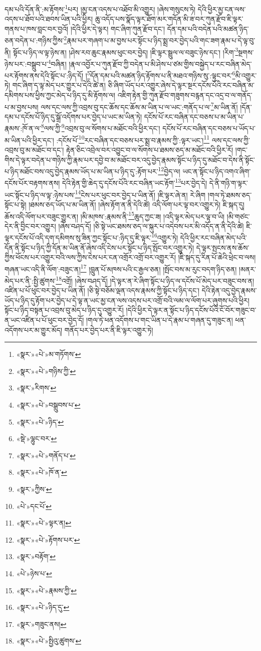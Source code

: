 དམ་པའི་དོན་ནི་:མ་རྟོགས་\footnote{«སྣར་»«པེ་»མ་གཏོགས་}པར། །མྱ་ངན་འདས་པ་འཐོབ་མི་འགྱུར། །ཞེས་གསུངས་ཏེ། དེའི་ཕྱིར་མྱ་ངན་ལས་འདས་པ་ཐོབ་པའི་ཐབས་ཡིན་པའི་ཕྱིར། ཆུ་འདོད་པས་སྣོད་ལྟར་ཐོག་མར་གདོན་མི་ཟ་བར་ཀུན་རྫོབ་ཇི་ལྟར་གནས་པ་ཁས་བླང་བར་བྱའོ། །དེའི་ཕྱིར་དེ་ལྟར། གང་ཞིག་ཀུན་རྫོབ་དང་། དོན་དམ་པའི་བདེན་པའི་མཚན་ཉིད་ཅན་བདེན་པ་:གཉིས་ཀྱིས་\footnote{«སྣར་»«པེ་»གཉིས་ཀྱི་}རྣམ་པར་གཞག་པ་མ་བྱས་པར་སྟོང་པ་ཉིད་སྨྲ་བར་བྱེད་པའི་གང་ཟག་རྣམ་པ་དེ་ལྟ་བུ་ནི། སྟོང་པ་ཉིད་ལ་ལྟ་ཉེས་ན། །ཤེས་རབ་ཆུང་རྣམས་ཕུང་བར་བྱེད། །ཇི་ལྟར་སྦྲུལ་ལ་བཟུང་ཉེས་དང་། །རིག་\footnote{«སྣར་»རིགས་}སྔགས་ཉེས་པར་:བསྒྲུབ་པ་\footnote{«སྣར་»«པེ་»བསྒྲུབས་པ་}བཞིན། །རྣལ་འབྱོར་པ་ཀུན་རྫོབ་ཀྱི་བདེན་པ་མི་ཤེས་པ་ཙམ་གྱིས་བསྐྱེད་པ་རང་བཞིན་མེད་པར་རྟོགས་ནས་དེའི་སྟོང་པ་:ཉིད་དོ། །\footnote{«སྣར་»«པེ་»ཉིད་}དོན་དམ་པའི་མཚན་ཉིད་རྟོགས་པ་ནི་མཐའ་གཉིས་སུ་:ལྟུང་བར་\footnote{«སྡེ་»ལྷུང་བར་}མི་འགྱུར་ཏེ། གང་ཞིག་ད་ལྟ་མེད་པར་གྱུར་པ་དེའི་ཚེ་ན། ཅི་ཞིག་ཡོད་པར་འགྱུར་ཞེས་དེ་ལྟར་སྔར་དངོས་པོའི་རང་བཞིན་མ་དམིགས་པས་ཕྱིས་ཀྱང་མེད་པ་ཉིད་དུ་མི་རྟོགས་ལ། འཇིག་རྟེན་གྱི་ཀུན་རྫོབ་གཟུགས་བརྙན་དང་འདྲ་བ་ལ་གནོད་པ་མ་བྱས་པས། ལས་དང་ལས་ཀྱི་འབྲས་བུ་དང་ཆོས་དང་ཆོས་མ་ཡིན་པ་ལ་ཡང་:གནོད་པ་ལ་\footnote{«སྣར་»«པེ་»གནོད་པ་}མ་ཡིན་ནོ། །དོན་དམ་པ་དངོས་པོ་ཉིད་དུ་སྒྲོ་འདོགས་པར་བྱེད་པ་ཡང་མ་ཡིན་ཏེ། དངོས་པོ་རང་བཞིན་དང་བཅས་པ་མ་ཡིན་པ་རྣམས་:ཁོ་ན་ལ་\footnote{«སྣར་»«པེ་»ཁོ་ན་}ལས་ཀྱི་\footnote{«སྣར་»ཀྱིས་}འབྲས་བུ་ལ་སོགས་པ་མཐོང་བའི་ཕྱིར་དང་། དངོས་པོ་རང་བཞིན་དང་བཅས་པ་ཡོད་པ་མ་ཡིན་པའི་ཕྱིར་དང་། :དངོས་པོ་\footnote{«པེ་»དང་པོ་}རང་བཞིན་དང་བཅས་པར་སྨྲ་བ་རྣམས་ཀྱི་:ལྟར་ཡང་།\footnote{«སྣར་»«པེ་»ལྟར་ན།} ལས་དང་ལས་ཀྱི་འབྲས་བུ་མ་མཐོང་བ་དང་། རྟེན་ཅིང་འབྲེལ་བར་འབྱུང་བ་ལ་སོགས་པ་ཐམས་ཅད་མ་མཐོང་བའི་ཕྱིར་རོ། །གང་གིས་དེ་ལྟར་བདེན་པ་གཉིས་ཀྱི་རྣམ་པར་དབྱེ་བ་མ་མཐོང་བར་འདུ་བྱེད་རྣམས་སྟོང་པ་ཉིད་དུ་མཐོང་བ་དེས་ནི་སྟོང་པ་ཉིད་མཐོང་བས་འདུ་བྱེད་རྣམས་ཡོད་པ་མ་ཡིན་པ་ཉིད་དུ་:རྟོག་པར་\footnote{«སྣར་»«པེ་»རྟོགས་པར་}བྱེད་ལ། ཡང་ན་སྟོང་པ་ཉིད་འགའ་ཞིག་དངོས་པོར་བརྟགས་ནས། དེའི་རྟེན་གྱི་ཆེད་དུ་དངོས་པོའི་རང་བཞིན་ཡང་རྟོག་\footnote{«སྣར་»བརྟོག་}པར་བྱེད་དེ། དེ་ནི་གཉི་ག་ལྟར་ཡང་སྟོང་པ་ཉིད་ལ་ལྟ་:ཉེས་པས་\footnote{«པེ་»ཉེས་པ་}ངེས་པར་ཕུང་བར་བྱེད་པ་ཡིན་ནོ། །ཇི་ལྟར་ཞེ་ན། རེ་ཞིག །གལ་ཏེ་ཐམས་ཅད་སྟོང་པ་སྟེ། །ཐམས་ཅད་ཡོད་པ་མ་ཡིན་ནོ། །ཞེས་རྟོག་ན་ནི་དེའི་ཚེ། འདི་ལོག་པར་ལྟ་བར་འགྱུར་ཏེ། ཇི་སྐད་དུ། ཆོས་འདི་ལོག་པར་བཟུང་གྱུར་ན། །མི་མཁས་:རྣམས་ནི་\footnote{«སྣར་»«པེ་»རྣམས་ཀྱི་}ཆུད་ཀྱང་ཟ། །འདི་ལྟར་མེད་པར་ལྟ་བ་ཡི། །མི་གཙང་དེར་ནི་བྱིང་བར་འགྱུར། །ཞེས་བཤད་དོ། །ཅི་སྟེ་ཡང་ཐམས་ཅད་ལ་སྐུར་པ་འདེབས་པར་མི་འདོད་ན་ནི་དེའི་ཚེ། ཇི་ལྟར་དངོས་པོ་འདི་དག་དམིགས་སུ་ཟིན་ཀྱང་སྟོང་པ་:ཉིད་དུ་ཇི་ལྟར་\footnote{«སྣར་»«པེ་»ཉིད་དུ་}འགྱུར་ཏེ། དེའི་ཕྱིར་རང་བཞིན་མེད་པའི་དོན་ནི་སྟོང་པ་ཉིད་ཀྱི་དོན་མ་ཡིན་ནོ་ཞེས་འདི་ངེས་པར་སྟོང་པ་ཉིད་སྤོང་བར་འགྱུར་ཏེ། དེ་ལྟར་སྤངས་ནས་ཆོས་ཀྱིས་ཕོངས་པར་འགྱུར་བའི་ལས་ཀྱིས་ངེས་པར་ངན་འགྲོར་འགྲོ་བར་འགྱུར་རོ། །ཇི་སྐད་དུ་རིན་པོ་ཆེའི་ཕྲེང་བ་ལས། གཞན་ཡང་འདི་ནི་ལོག་:བཟུང་ན།\footnote{«སྣར་»གཟུང་ནས།} །བླུན་པོ་མཁས་པའི་ང་རྒྱལ་ཅན། །སྤོང་བས་མ་རུང་བདག་ཉིད་ཅན། །མནར་མེད་པར་ནི་:སྤྱི་ཚུགས་\footnote{«སྣར་»«པེ་»སྤྱིའུ་ཚུགས་}འགྲོ། །ཞེས་བཤད་དོ། །དེ་ལྟར་ན་རེ་ཞིག་སྟོང་པ་ཉིད་ལ་དངོས་པོ་མེད་པར་བཟུང་བས་ན། འཛིན་པ་པོ་ཕུང་བར་བྱེད་པ་ཡིན་ནོ། །ཅི་སྟེ་བཅོམ་ལྡན་འདས་རྣམས་ཀྱི་སྟོང་པ་ཉིད་དང་། དེའི་རྟེན་འདུ་བྱེད་རྣམས་ཡོད་པ་ཉིད་དུ་རྟོག་པར་བྱེད་པ་དེ་ལྟ་ན་ཡང་མྱ་ངན་ལས་འདས་པར་འགྲོ་བའི་ལམ་ལ་ལོག་པར་ཞུགས་པའི་ཕྱིར། སྟོང་པ་ཉིད་བསྟན་པ་འབྲས་བུ་མེད་པ་ཉིད་དུ་འགྱུར་རོ། །དེའི་ཕྱིར་དེ་ལྟར་ན་སྟོང་པ་ཉིད་དངོས་པོའི་ངོ་བོར་གཟུང་བ་ན་ཡང་འཛིན་པ་པོ་ཕུང་བར་བྱེད་དོ། །གལ་ཏེ་ཕན་འདོགས་པ་གང་ཡིན་པ་དེ་རྣམ་པ་གཞན་དུ་གཟུང་ན། ཕན་འདོགས་པར་མ་གྱུར་མོད། གནོད་པར་བྱེད་པར་ནི་ཇི་ལྟར་འགྱུར་ཏེ། 